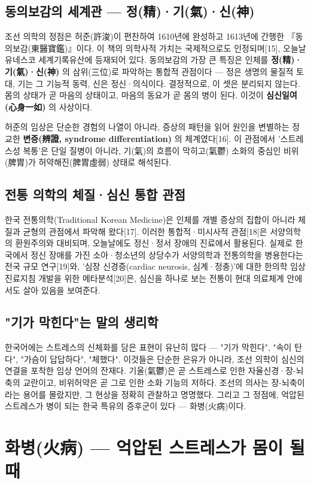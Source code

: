 \documentclass[11pt,oneside]{book}
\begin{document}
\subsection{동의보감의 세계관 — 정(精)·기(氣)·신(神)}
조선 의학의 정점은 허준(許浚)이 편찬하여 1610년에 완성하고 1613년에 간행한 『동의보감(東醫寶鑑)』이다. 이 책의 의학사적 가치는 국제적으로도 인정되며[15], 오늘날 유네스코 세계기록유산에 등재되어 있다. 동의보감의 가장 큰 특징은 인체를 \textbf{정(精)·기(氣)·신(神)} 의 삼위(三位)로 파악하는 통합적 관점이다 — 정은 생명의 물질적 토대, 기는 그 기능적 동력, 신은 정신·의식이다. 결정적으로, 이 셋은 분리되지 않는다. 몸의 상태가 곧 마음의 상태이고, 마음의 동요가 곧 몸의 병이 된다. 이것이 \textbf{심신일여(心身一如)} 의 사상이다.

허준의 임상은 단순한 경험의 나열이 아니라, 증상의 패턴을 읽어 원인을 변별하는 정교한 \textbf{변증(辨證, syndrome differentiation)} 의 체계였다[16]. 이 관점에서 '스트레스성 복통'은 단일 질병이 아니라, 기(氣)의 흐름이 막히고(氣鬱) 소화의 중심인 비위(脾胃)가 허약해진(脾胃虛弱) 상태로 해석된다.

\subsection{전통 의학의 체질·심신 통합 관점}
한국 전통의학(Traditional Korean Medicine)은 인체를 개별 증상의 집합이 아니라 체질과 균형의 관점에서 파악해 왔다[17]. 이러한 통합적·미시사적 관점[18]은 서양의학의 환원주의와 대비되며, 오늘날에도 정신·정서 장애의 진료에서 활용된다. 실제로 한국에서 정신 장애를 가진 소아·청소년의 상당수가 서양의학과 전통의학을 병용한다는 전국 규모 연구[19]와, '심장 신경증(cardiac neurosis, 심계·정충)'에 대한 한의학 임상진료지침 개발을 위한 메타분석[20]은, 심신을 하나로 보는 전통이 현대 의료체계 안에서도 살아 있음을 보여준다.

\subsection{"기가 막힌다"는 말의 생리학}
한국어에는 스트레스의 신체화를 담은 표현이 유난히 많다 — "기가 막힌다", "속이 탄다", "가슴이 답답하다", "체했다". 이것들은 단순한 은유가 아니라, 조선 의학이 심신의 연결을 포착한 임상 언어의 잔재다. 기울(氣鬱)은 곧 스트레스로 인한 자율신경·장-뇌축의 교란이고, 비위허약은 곧 그로 인한 소화 기능의 저하다. 조선의 의사는 장-뇌축이라는 용어를 몰랐지만, 그 현상을 정확히 관찰하고 명명했다. 그리고 그 정점에, 억압된 스트레스가 병이 되는 한국 특유의 증후군이 있다 — 화병(火病)이다.

\section{화병(火病) — 억압된 스트레스가 몸이 될 때}
\end{document}
